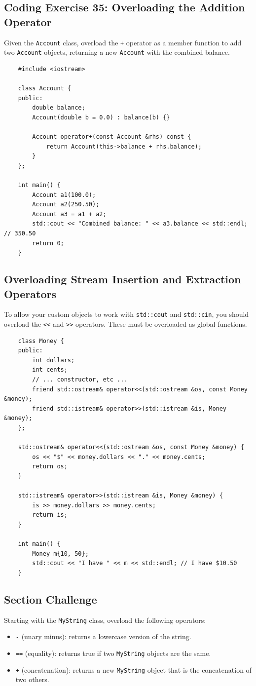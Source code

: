 \subsection{Coding Exercise 35: Overloading the Addition Operator}
Given the \texttt{Account} class, overload the \texttt{+} operator as a member function to add two \texttt{Account} objects, returning a new \texttt{Account} with the combined balance.
\begin{lstlisting}
	#include <iostream>

	class Account {
	public:
		double balance;
		Account(double b = 0.0) : balance(b) {}

		Account operator+(const Account &rhs) const {
			return Account(this->balance + rhs.balance);
		}
	};

	int main() {
		Account a1(100.0);
		Account a2(250.50);
		Account a3 = a1 + a2;
		std::cout << "Combined balance: " << a3.balance << std::endl; // 350.50
		return 0;
	}
\end{lstlisting}

\subsection{Overloading Stream Insertion and Extraction Operators}
To allow your custom objects to work with \texttt{std::cout} and \texttt{std::cin}, you should overload the \texttt{<<} and \texttt{>>} operators. These must be overloaded as global functions.
\begin{lstlisting}
	class Money {
	public:
		int dollars;
		int cents;
		// ... constructor, etc ...
		friend std::ostream& operator<<(std::ostream &os, const Money &money);
		friend std::istream& operator>>(std::istream &is, Money &money);
	};

	std::ostream& operator<<(std::ostream &os, const Money &money) {
		os << "$" << money.dollars << "." << money.cents;
		return os;
	}

	std::istream& operator>>(std::istream &is, Money &money) {
		is >> money.dollars >> money.cents;
		return is;
	}

	int main() {
		Money m{10, 50};
		std::cout << "I have " << m << std::endl; // I have $10.50
	}
\end{lstlisting}

\subsection{Section Challenge}
Starting with the \texttt{MyString} class, overload the following operators:
\begin{itemize}
	\item \texttt{-} (unary minus): returns a lowercase version of the string.
	\item \texttt{==} (equality): returns true if two \texttt{MyString} objects are the same.
	\item \texttt{+} (concatenation): returns a new \texttt{MyString} object that is the concatenation of two others.
\end{itemize}

